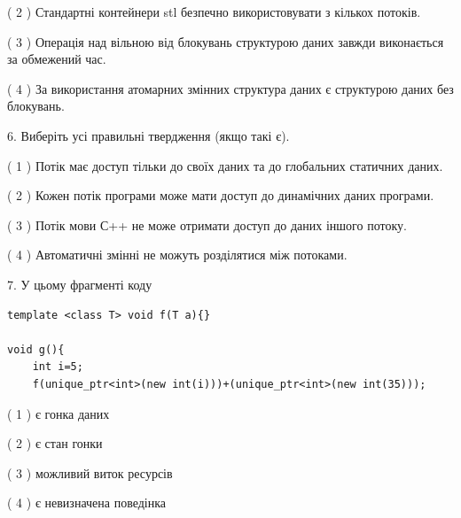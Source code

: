 \documentclass[12pt, ukrainian]{article}
\begin{document}
\begin {large}
{( 2 ) Стандартні контейнери stl безпечно використовувати з кількох потоків.%

( 3 ) Операція над вільною від блокувань структурою даних завжди виконається за обмежений час.%

( 4 ) За використання атомарних змінних структура даних є структурою даних без блокувань.%
\newpage



\vspace{5mm}
6. Виберіть усі правильні твердження (якщо такі є).\par
\vspace{2mm}

( 1 ) Потік має доступ тільки до своїх даних та до глобальних статичних даних.%

( 2 ) Кожен потік програми може мати доступ до динамічних даних програми.%

( 3 ) Потік мови С++ не може отримати доступ до даних іншого потоку.%

( 4 ) Автоматичні змінні не можуть розділятися між потоками.%


\vspace{5mm}
7. У цьому фрагменті коду
\begin{verbatim}
template <class T> void f(T a){}

void g(){
    int i=5;
    f(unique_ptr<int>(new int(i)))+(unique_ptr<int>(new int(35)));
\end{verbatim}
( 1 ) є гонка даних%

( 2 ) є стан гонки%

( 3 ) можливий виток ресурсів%

( 4 ) є невизначена поведінка%
}
\end {large}
\end{document}
